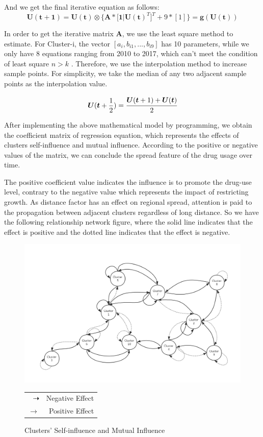 \documentclass[11pt]{article}
\begin{document}
And we get the final iterative equation as follows:
\begin{equation}
	\bm{U(t+1) = U(t)} \otimes \{\bm{A * [1 | U(t)}^{T}]^{T} + 9 * [1]\} = \bm{g(U(t))}
\end{equation}

In order to get the iterative matrix $\bm{A}$, we use the least square method to estimate. For Cluster-i, the vector $[a_{i}, b_{i1}, ..., b_{i9}]$ has 10 parameters, while we only have 8 equations ranging from 2010 to 2017, which can’t meet the condition of least square $n > k$ . Therefore, we use the interpolation method to increase sample points. For simplicity, we take the median of any two adjacent sample points as the interpolation value.

\begin{equation}
	\bm{U}(\bm{t}+\frac{1}{2}) = \cfrac{\bm{U}(\bm{t}+1) + \bm{U}(\bm{t})}{2}
\end{equation}

After implementing the above mathematical model by programming, we obtain the coefficient matrix of regression equation, which represents the effects of clusters self-influence and mutual influence. According to the positive or negative values of the matrix, we can conclude the spread feature of the drug usage over time. 

The positive coefficient value indicates the influence is to promote the drug-use level, contrary to the negative value which represents the impact of restricting growth. As distance factor has an effect on regional spread, attention is paid to the propagation between adjacent clusters regardless of long distance. So we have the following relationship network figure, where the solid line indicates that the effect is positive and the dotted line indicates that the effect is negative.

\begin{figure}[H]
	\centering
	\includegraphics[scale=0.45]{./figures/15.png}
	\small
	\begin{tabular}{rr}
		$\dashrightarrow$ & Negative Effect \\
		$\longrightarrow$ & Positive Effect
	\end{tabular}
	\caption{Clusters' Self-influence and Mutual Influence}
	\label{Fig15}
\end{figure}
\end{document}
